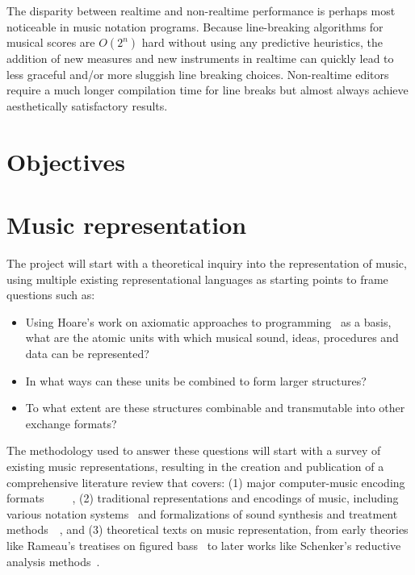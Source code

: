 \documentclass{article}
\begin{document}
The disparity between realtime and non-realtime performance is perhaps most
noticeable in music notation programs. Because line-breaking algorithms for
musical scores are $O(2^n)$ hard without using any predictive heuristics, the
addition of new measures and new instruments in realtime can quickly lead to
less graceful and/or more sluggish line breaking choices. Non-realtime
editors require a much longer compilation time for line breaks but almost
always achieve aesthetically satisfactory results.



\section{Objectives}\label{sec:objectives}
\section{Music representation}\label{sec:music-representation}
The project will start with a theoretical inquiry into the representation of
music, using multiple existing representational languages as starting points
to frame questions such as:
\begin{itemize}
\item Using Hoare's work on axiomatic approaches to
programming~\cite{hoare1969axiomatic} as a basis, what are the atomic units
with which musical sound, ideas, procedures and data can be represented?
\item In what ways can these units be combined to form
larger structures?
\item To what extent are these structures combinable and transmutable into
other exchange formats?
\end{itemize}

The methodology used to answer these questions will start with a survey of
existing music representations, resulting in the creation and publication of
a comprehensive literature review that covers: (1) major computer-music
encoding
formats~\cite{hoos98}~\cite{lilypond06}~\cite{good2001musicxml}~\cite{alvaro2010musicjson}~\cite{roland2002music},
(2) traditional representations and encodings of music,
including various notation systems~\cite{hultberg2000printed} and formalizations
of sound synthesis and treatment
methods~\cite{mason1953feedback}~\cite{foote1999visualizing},
and (3) theoretical texts on music representation, from
early theories like Rameau's treatises on figured bass~\cite{rameau:1722} to later works
like Schenker’s reductive analysis methods~\cite{schenker:1935}.
\end{document}
